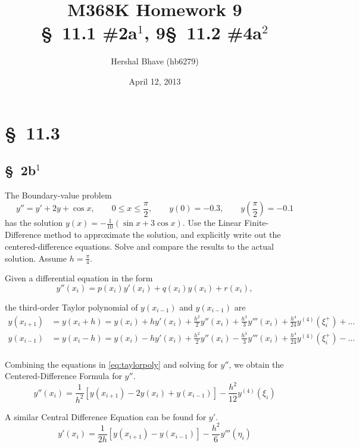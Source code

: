 \documentclass[12pt]{article}
\title{M368K Homework 9 \\
  \normalsize{\S~11.1 \#2a$^1$, 9\quad \S~11.2 \#4a$^2$}}
\author{Hershal Bhave (hb6279)}
\date{April 12, 2013}
\begin{document}
\maketitle

\section{\S~11.3}
\subsection{\S~2b$^1$}

The Boundary-value problem 
$$ y'' = y'+2y+\cos x, \qquad 0\leq x\leq\frac{\pi}{2},\qquad y(0)=-0.3,\qquad y\left(\frac{\pi}{2}\right)=-0.1 $$
has the solution $y(x) = -\frac{1}{10}(\sin x + 3\cos x)$. Use the
Linear Finite-Difference method to approximate the solution, and
explicitly write out the centered-difference equations. Solve and
compare the results to the actual solution. Assume $h=\frac{\pi}{4}$.

Given a differential equation in the form
\begin{equation}
  \label{eq:gendiff}
  y''(x_i)=p(x_i)y'(x_i)+q(x_i)y(x_i)+r(x_i),
\end{equation}

the third-order Taylor polynomial of $y(x_{i-1})$ and $y(x_{i-1})$ are
\begin{equation}
  \label{eq:taylorpoly}
  \begin{aligned}
    y(x_{i+1}) &= y(x_i+h) = y(x_i) + hy'(x_i)+\frac{h^2}{2}y''(x_i) + \frac{h^3}{3}y'''(x_i)+\frac{h^4}{24}y^{(4)}(\xi_i^+)+\ldots\\
    y(x_{i-1}) &= y(x_i-h) = y(x_i) - hy'(x_i)+\frac{h^2}{2}y''(x_i)
    - \frac{h^3}{3}y'''(x_i)+\frac{h^4}{24}y^{(4)}(\xi_i^+)-\ldots \\
  \end{aligned}
\end{equation}

Combining the equations in \cref{eq:taylorpoly} and solving for $y''$, we obtain the
Centered-Difference Formula for $y''$.
\begin{equation}
  \label{eq:centdiffypp}
  y''(x_i)=\frac{1}{h^2}[y(x_{i+1})-2y(x_i)+y(x_{i-1})]-\frac{h^2}{12}y^{(4)}(\xi_i) 
\end{equation}

A similar Central Difference Equation can be found for $y'$.
\begin{equation}
  \label{eq:centdiffyp}
  y'(x_i)=\frac{1}{2h}[y(x_{i+1})-y(x_{i-1})]-\frac{h^2}{6}y'''(\eta_i)
\end{equation}
\end{document}
